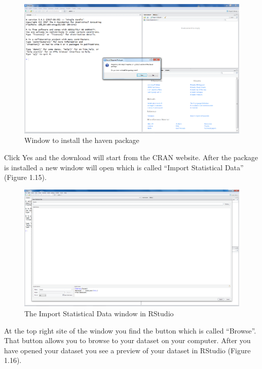 \documentclass[]{book}
\begin{document}
\begin{figure}

{\centering \includegraphics[width=0.9\linewidth]{images/fig1.14} 

}

\caption{Window to install the haven package}\label{fig:fig14}
\end{figure}

Click Yes and the download will start from the CRAN website. After the
package is installed a new window will open which is called ``Import
Statistical Data'' (Figure 1.15).

\begin{figure}

{\centering \includegraphics[width=0.9\linewidth]{images/fig1.15} 

}

\caption{The Import Statistical Data window in RStudio}\label{fig:fig15}
\end{figure}

At the top right site of the window you find the button which is called
``Browse''. That button allows you to browse to your dataset on your
computer. After you have opened your dataset you see a preview of your
dataset in RStudio (Figure 1.16).
\end{document}

